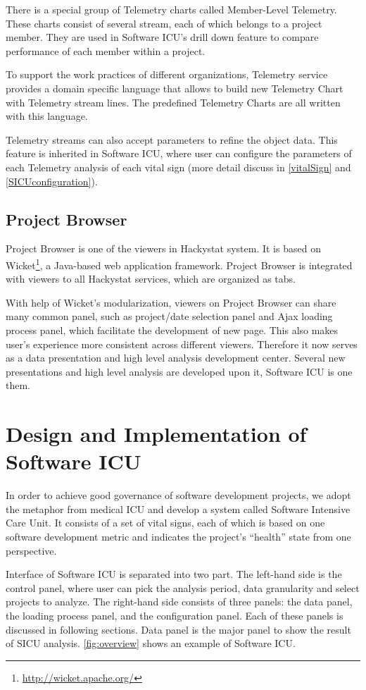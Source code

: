 There is a special group of Telemetry charts called Member-Level Telemetry. These charts consist of several stream, each of which belongs to a project member. They are used in Software ICU's drill down feature to compare performance of each member within a project. 

To support the work practices of different organizations, Telemetry service provides a domain specific language that allows to build new Telemetry Chart with Telemetry stream lines. The predefined Telemetry Charts are all written with this language.

Telemetry streams can also accept parameters to refine the object data. This feature is inherited in Software ICU, where user can configure the parameters of each Telemetry analysis of each vital sign (more detail discuss in \autoref{vitalSign} and \autoref{SICUconfiguration}).

\section {Project Browser}
Project Browser is one of the viewers in Hackystat system. It is based on Wicket\footnote{\url{http://wicket.apache.org/}}, a Java-based web application framework. Project Browser is integrated with viewers to all Hackystat services, which are organized as tabs. 

With help of Wicket's modularization, viewers on Project Browser can share many common panel, such as project/date selection panel and Ajax loading process panel, which facilitate the development of new page. This also makes user's experience more consistent across different viewers. Therefore it now serves as a data presentation and high level analysis development center. Several new presentations and high level analysis are developed upon it, Software ICU is one them.

\chapter{Design and Implementation of Software ICU}
In order to achieve good governance of software development projects, we adopt the metaphor from medical ICU and develop a system called Software Intensive Care Unit. It consists of a set of vital signs, each of which is based on one software development metric and indicates the project's ``health'' state from one perspective.

Interface of Software ICU is separated into two part. The left-hand side is the control panel, where user can pick the analysis period, data granularity and select projects to analyze. The right-hand side consists of three panels: the data panel, the loading process panel, and the configuration panel. Each of these panels is discussed in following sections. Data panel is the major panel to show the result of SICU analysis. \autoref{fig:overview} shows an example of Software ICU.

